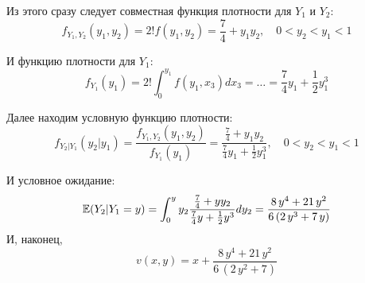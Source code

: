 \begin{enumerate}
\begin{enumerate}
Из этого сразу следует совместная функция плотности для $ Y_{1} $ и $ Y_{2} $:
\begin{equation}
f_{Y_{1},Y_{2}}(y_{1},y_{2})=2! f(y_{1},y_{2})=\frac{7}{4}+y_{1}y_{2}, \quad 0<y_{2}<y_{1}<1
\end{equation}

И функцию плотности для $ Y_{1} $:
\begin{equation}
f_{Y_{1}}(y_{1})=2!\int_{0}^{y_{1}} f(y_{1},x_{3}) dx_{3}=\ldots=\frac{7}{4}y_{1}+\frac{1}{2}y_{1}^{3}
\end{equation}

Далее находим условную функцию плотности:
\begin{equation}
 f_{Y_{2}|Y_{1}}(y_{2}|y_{1})=\frac{f_{Y_{1},Y_{2}}(y_{1},y_{2})}{f_{Y_{1}}(y_{1})}=\frac{\frac{7}{4}+y_{1}y_{2}}{\frac{7}{4}y_{1}+\frac{1}{2}y_{1}^{3}}, \quad 0<y_{2}<y_{1}<1
\end{equation}

И условное ожидание:
\begin{equation}
\mathbb{E}(Y_{2}|Y_{1}=y)=\int_{0}^{y} y_{2} \frac{\frac{7}{4}+yy_{2}}{\frac{7}{4}y+\frac{1}{2}y^{3}}dy_{2}=\frac{8 \, y^{4} + 21 \, y^{2}}{6 \, {\left(2 \, y^{3} + 7 \, y\right)}}
\end{equation}
И, наконец,
\begin{equation}
v(x,y)=x+\frac{8 \, y^{4} + 21 \, y^{2}}{6 \, {\left(2 \, y^{2} + 7\right)}}
\end{equation}

\end{enumerate}
\end{enumerate}

